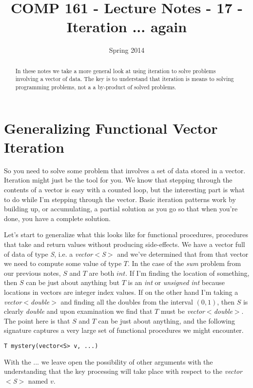 \documentclass[]{tufte-handout}
\title{COMP 161 - Lecture Notes - 17 - Iteration ... again}
\date{Spring 2014}
\begin{document}
 
\maketitle

\begin{abstract}
In these notes we take a more general look at using iteration to solve problems involving a vector of data. The key is to understand that iteration is means to solving programming problems, not a a by-product of solved problems. 
\end{abstract}

\section{Generalizing Functional Vector Iteration}

So you need to solve some problem that involves a set of data stored in a vector.  Iteration might just be the tool for you. We know that stepping through the contents of a vector is easy with a counted loop, but the interesting part is what to do while I'm stepping through the vector.  Basic iteration patterns work by building up, or accumulating, a partial solution as you go so that when you're done, you have a complete solution. 

Let's start to generalize what this looks like for functional procedures, procedures that take and return values without producing side-effects. We have a vector full of data of type \textit{S}, i.e. a \textit{vector$<$S$>$} and we've determined that from that vector we need to compute some value of type $T$. In the case of the \textit{sum} problem from our previous notes, $S$ and $T$ are both $int$.  If I'm finding the location of something, then $S$ can be just about anything but $T$ is an \textit{int} or \textit{unsigned int} because locations in vectors are integer index values. If on the other hand I'm taking a \textit{vector$<$double$>$} and finding all the doubles from the interval $(0,1)$, then $S$ is clearly \textit{double} and upon examination we find that $T$ must be \textit{vector$<$double$>$}. The point here is that $S$ and $T$ can be just about anything, and the following signature captures a very large set of functional procedures we might encounter.
\begin{verbatim}
T mystery(vector<S> v, ...)
\end{verbatim}
With the $...$ we leave open the possibility of other arguments with the understanding that the key processing will take place with respect to the \textit{vector$<$S$>$} named $v$.
\end{document}
